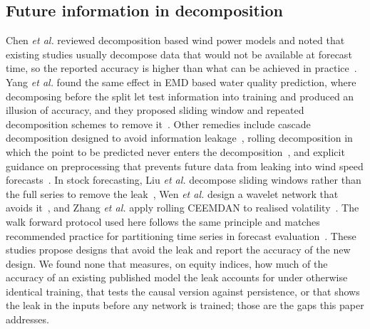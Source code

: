 \documentclass[pdflatex,sn-mathphys-num]{sn-jnl}%
\theoremstyle{thmstyleone}%
\theoremstyle{thmstyletwo}%
\theoremstyle{thmstylethree}%
\begin{document}
\subsection{Future information in decomposition}
Chen \emph{et al.} reviewed decomposition based wind power models and noted
that existing studies usually decompose data that would not be available at
forecast time, so the reported accuracy is higher than what can be achieved in
practice~\cite{chen2022}. Yang \emph{et al.} found the same effect in EMD
based water quality prediction, where decomposing before the split let test
information into training and produced an illusion of accuracy, and they
proposed sliding window and repeated decomposition schemes to remove
it~\cite{emdleak2024}. Other remedies include cascade decomposition designed to
avoid information leakage~\cite{wang2024}, rolling decomposition in which the
point to be predicted never enters the decomposition~\cite{yao2025}, and
explicit guidance on preprocessing that prevents future data from leaking into
wind speed forecasts~\cite{pang2026}. In stock forecasting, Liu \emph{et al.}
decompose sliding windows rather than the full series to remove the
leak~\cite{liu2022,liu2024}, Wen \emph{et al.} design a wavelet network that avoids
it~\cite{wen2024}, and Zhang \emph{et al.} apply rolling CEEMDAN to realised
volatility~\cite{zhang2025}. The walk forward protocol used here follows the
same principle and matches recommended practice for partitioning time series
in forecast evaluation~\cite{hewamalage2022}. These studies propose designs that
avoid the leak and report the accuracy of the new design. We found none that
measures, on equity indices, how much of the accuracy of an existing published
model the leak accounts for under otherwise identical training, that tests the
causal version against persistence, or that shows the leak in the inputs before
any network is trained; those are the gaps this paper addresses.
\end{document}
